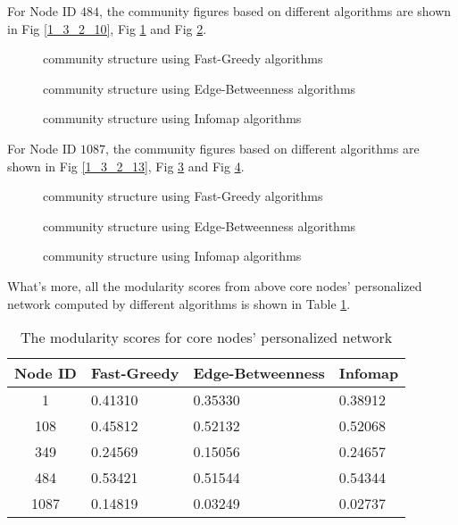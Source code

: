 \documentclass[11pt]{article}
\makeatletter
\def\maxwidth{\ifdim\Gin@nat@width>\linewidth\linewidth
    \else\Gin@nat@width\fi}
\let\Oldincludegraphics\includegraphics
\renewcommand{\includegraphics}[1]{\Oldincludegraphics[width=.8\maxwidth]{#1}}
\makeatother
\begin{document}
For Node ID $484$, the community figures based on different algorithms are shown in Fig \ref{1_3_2_10}, Fig \ref{1_3_2_11} and Fig \ref{1_3_2_12}.

\begin{figure}[h]
\centering
\begin{minipage}[t]{0.48\textwidth}
\centering
{}
\caption{community structure using Fast-Greedy algorithms}
\label{1_3_2_10}
\end{minipage}
\begin{minipage}[t]{0.48\textwidth}
\centering
{}
\caption{community structure using Edge-Betweenness algorithms}
\label{1_3_2_11}
\end{minipage}
\end{figure}
\begin{figure}[h]
\centering
{}
\caption{community structure using Infomap algorithms}
\label{1_3_2_12}
\end{figure}

For Node ID $1087$, the community figures based on different algorithms are shown in Fig \ref{1_3_2_13}, Fig \ref{1_3_2_14} and Fig \ref{1_3_2_15}.

\begin{figure}[h]
\centering
\begin{minipage}[t]{0.48\textwidth}
\centering
{}
\caption{community structure using Fast-Greedy algorithms}
\label{1_3_2_13}
\end{minipage}
\begin{minipage}[t]{0.48\textwidth}
\centering
{}
\caption{community structure using Edge-Betweenness algorithms}
\label{1_3_2_14}
\end{minipage}
\end{figure}
\begin{figure}[h]
\centering
{}
\caption{community structure using Infomap algorithms}
\label{1_3_2_15}
\end{figure}

What's more, all the modularity scores from above core nodes' personalized network computed by different algorithms is shown in Table \ref{modtable2}.

\begin{table}[h]
\center
\caption{The modularity scores for core nodes' personalized network}
\begin{tabular}{c|l|l|l} 
\textbf{Node ID} & \textbf{Fast-Greedy} & \textbf{Edge-Betweenness} & \textbf{Infomap}\\\hline
1 & 0.41310 & 0.35330 & 0.38912\\
108 & 0.45812 & 0.52132 & 0.52068\\
349 & 0.24569 & 0.15056 & 0.24657\\
484 & 0.53421 & 0.51544 & 0.54344\\
1087 & 0.14819 & 0.03249 & 0.02737\\
\end{tabular}
\label{modtable2}
\end{table}
\end{document}

